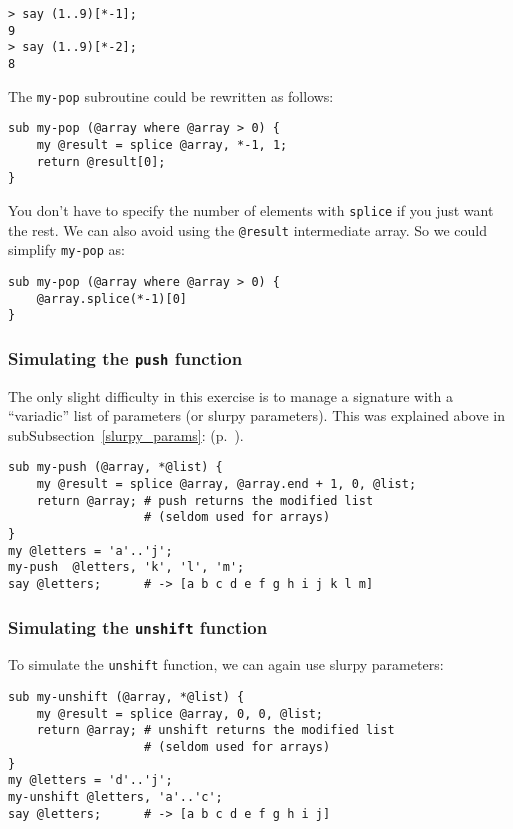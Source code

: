 \begin{verbatim}
> say (1..9)[*-1];
9
> say (1..9)[*-2];
8
\end{verbatim}

The {\tt my-pop} subroutine could be rewritten as follows:

\begin{verbatim}
sub my-pop (@array where @array > 0) {
    my @result = splice @array, *-1, 1;
    return @result[0];
}
\end{verbatim}

You don't have to specify the number of elements with 
{\tt splice} if you just want the rest. We can also 
avoid using the \verb'@result'  intermediate array. 
So we could simplify {\tt my-pop} as:

\begin{verbatim}
sub my-pop (@array where @array > 0) {
    @array.splice(*-1)[0]
}
\end{verbatim}


\subsubsection{Simulating the {\tt push} function}

The only slight difficulty in this exercise is to manage a signature with a 
``variadic'' list of parameters (or slurpy parameters). This 
was explained above in subSubsection~\ref{slurpy_params}:
(p.~\pageref{slurpy_params}).

\begin{verbatim}
sub my-push (@array, *@list) {
    my @result = splice @array, @array.end + 1, 0, @list;
    return @array; # push returns the modified list
                   # (seldom used for arrays)
}
my @letters = 'a'..'j';
my-push  @letters, 'k', 'l', 'm';
say @letters;      # -> [a b c d e f g h i j k l m]
\end{verbatim}

\subsubsection{Simulating the {\tt unshift} function}

To simulate the \verb'unshift' function, we can again 
use slurpy parameters:

\begin{verbatim}
sub my-unshift (@array, *@list) {
    my @result = splice @array, 0, 0, @list;
    return @array; # unshift returns the modified list
                   # (seldom used for arrays)
}
my @letters = 'd'..'j';
my-unshift @letters, 'a'..'c';
say @letters;      # -> [a b c d e f g h i j]
\end{verbatim}

